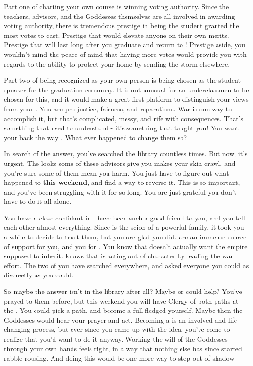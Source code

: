 \documentclass[char]{GL2020}
\begin{document}
Part one of charting your own course is winning voting authority. Since the teachers, advisors, and the Goddesses themselves are all involved in awarding voting authority, there is tremendous prestige in being the student granted the most votes to cast. Prestige that would elevate anyone on their own merits. Prestige that will last long after you graduate and return to \pShip{}! Prestige aside, you wouldn’t mind the peace of mind that having more votes would provide you with regards to the ability to protect your home by sending the storm elsewhere.

Part two of being recognized as your own person is being chosen as the student speaker for the graduation ceremony. It is not unusual for an underclassmen to be chosen for this, and it would make a great first platform to distinguish your views from your \cLoud{\parent}. You are pro justice, fairness, and reparations. War is one way to accomplish it, but that’s complicated, messy, and rife with consequences. That’s something that \cLoud{} used to understand - it’s something that \cLoud{\they} taught you! You want your \cLoud{\parent} back the way \cLoud{\they} \cLoud{\were}. What ever happened to change them so?

In search of the answer, you’ve searched the library countless times. But now, it’s urgent. The looks some of these advisors give you makes your skin crawl, and you’re sure some of them mean you harm. You just have to figure out what happened to \cLoud{} \textbf{this weekend}, and find a way to reverse it. This is so important, and you’ve been struggling with it for so long. You are just grateful you don’t have to do it all alone.

You have a close confidant in \cHeir{}. \cHeir{\They} have been such a good friend to you, and you tell each other almost everything. Since \cHeir{} is the scion of a powerful \pTech{} family, it took you a while to decide to trust them, but you are glad you did. \cHeir{\They} are an immense source of support for you, and you for \cHeir{\them}. You know that \cHeir{} doesn’t actually want the empire \cHeir{\they} \cHeir{\are} supposed to inherit. \cHeir{} knows that \cLoud{} is acting out of character by leading the war effort. The two of you have searched everywhere, and asked everyone you could as discreetly as you could.

So maybe the answer isn’t in the library after all? Maybe \cEbb{} or \cFlow{} could help? You’ve prayed to them before, but this weekend you will have Clergy of both paths at the \pSc{}. You could pick a path, and become a full fledged \cWarlordDaughter{\cleric} yourself. Maybe then the Goddesses would hear your prayer and act. Becoming a \cWarlordDaughter{\cleric} is an involved and life-changing process, but ever since you came up with the idea, you’ve come to realize that you’d want to do it anyway. Working the will of the Goddesses through your own hands feels right, in a way that nothing else has since \cLoud{} started rabble-rousing. And doing this would be one more way to step out of \cLoud{\their} shadow.
\end{document}
